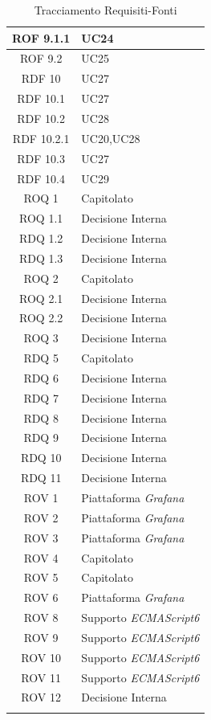 \begin{center}
\begin{longtable}[c]{|c|m{}|}
\hline
ROF 9.1.1 & UC24 \\
\hline
\rowcolor{grigio}ROF 9.2 & UC25 \\
\hline
RDF 10 & UC27 \\
\hline
\rowcolor{grigio}RDF 10.1 & UC27 \\
\hline
RDF 10.2 & UC28 \\
\hline
\rowcolor{grigio}RDF 10.2.1 & UC20,UC28 \\
\hline
RDF 10.3 & UC27 \\
\hline
\rowcolor{grigio}RDF 10.4 & UC29 \\
\hline
ROQ 1 & Capitolato \\ 
\hline
\rowcolor{grigio}ROQ 1.1 & Decisione Interna \\ 
\hline
RDQ 1.2 & Decisione Interna \\ 
\hline
\rowcolor{grigio}RDQ 1.3 & Decisione Interna \\ 
\hline
ROQ 2 & Capitolato \\ 
\hline
\rowcolor{grigio}ROQ 2.1 & Decisione Interna \\ 
\hline
ROQ 2.2 & Decisione Interna \\ 
\hline
\rowcolor{grigio}ROQ 3 & Decisione Interna \\ 
\hline
RDQ 5 & Capitolato \\ 
\hline
\rowcolor{grigio}RDQ 6 & Decisione Interna \\ 
\hline
RDQ 7 & Decisione Interna \\ 
\hline
\rowcolor{grigio}RDQ 8 & Decisione Interna \\ 
\hline
RDQ 9 & Decisione Interna \\ 
\hline
\rowcolor{grigio}RDQ 10 & Decisione Interna \\ 
\hline
RDQ 11 & Decisione Interna \\ 
\hline
\rowcolor{grigio}ROV 1 & Piattaforma \textit{Grafana} \\
\hline
ROV 2 & Piattaforma \textit{Grafana} \\
\hline
\rowcolor{grigio}ROV 3 & Piattaforma \textit{Grafana} \\
\hline
ROV 4 & Capitolato \\ 
\hline
\rowcolor{grigio}ROV 5 & Capitolato \\ 
\hline
ROV 6 & Piattaforma \textit{Grafana} \\
\hline
\rowcolor{grigio}ROV 8 & Supporto \textit{ECMAScript6} \\
\hline
ROV 9 & Supporto \textit{ECMAScript6} \\
\hline
\rowcolor{grigio}ROV 10 & Supporto \textit{ECMAScript6} \\
\hline
ROV 11 & Supporto \textit{ECMAScript6} \\
\hline
\rowcolor{grigio}ROV 12 & Decisione Interna \\ 
\hline
\caption{Tracciamento Requisiti-Fonti}
\end{longtable}
\end{center}


